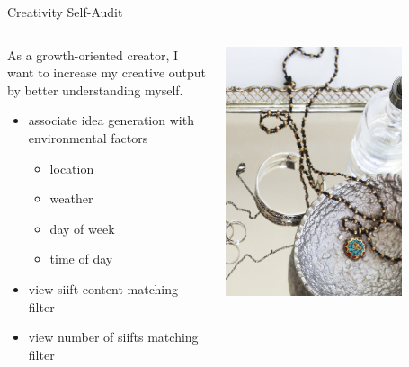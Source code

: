 \begin{frame}{Creativity Self-Audit}
\begin{columns}
\begin{column}{0.5\textwidth}
As a growth-oriented creator, I want to increase my creative output by better understanding myself.
\begin{itemize}
\item associate idea generation with environmental factors
\begin{itemize}
  \item location
  \item weather
  \item day of week
  \item time of day
\end{itemize}
\item view siift content matching filter
\item view number of siifts matching filter
\end{itemize}
\end{column}
\begin{column}{0.5\textwidth}  %
    \begin{center}
     \includegraphics[width=0.75\textwidth]{img/DeathtoStock_Clementine1}
     \end{center}
\end{column}
\end{columns}
\end{frame}

